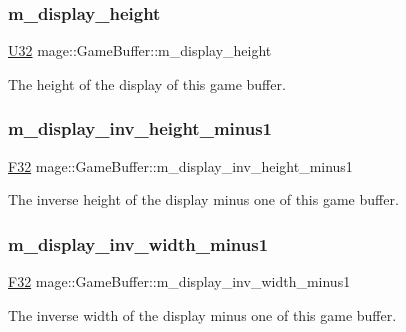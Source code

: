 \subsubsection{\texorpdfstring{m\+\_\+display\+\_\+height}{m\_display\_height}}
{\footnotesize\ttfamily \hyperlink{namespacemage_a41c104c036fba3756a74e19f793eeaa1}{U32} mage\+::\+Game\+Buffer\+::m\+\_\+display\+\_\+height}

The height of the display of this game buffer. \hypertarget{structmage_1_1_game_buffer_a1958156c6deefba5161e7aab7204a5ea}{}\label{structmage_1_1_game_buffer_a1958156c6deefba5161e7aab7204a5ea} 
\subsubsection{\texorpdfstring{m\+\_\+display\+\_\+inv\+\_\+height\+\_\+minus1}{m\_display\_inv\_height\_minus1}}
{\footnotesize\ttfamily \hyperlink{namespacemage_aa97e833b45f06d60a0a9c4fc22ae02c0}{F32} mage\+::\+Game\+Buffer\+::m\+\_\+display\+\_\+inv\+\_\+height\+\_\+minus1}

The inverse height of the display minus one of this game buffer. \hypertarget{structmage_1_1_game_buffer_a7db70b391fbf5ba58018d4f77ff06bba}{}\label{structmage_1_1_game_buffer_a7db70b391fbf5ba58018d4f77ff06bba} 
\subsubsection{\texorpdfstring{m\+\_\+display\+\_\+inv\+\_\+width\+\_\+minus1}{m\_display\_inv\_width\_minus1}}
{\footnotesize\ttfamily \hyperlink{namespacemage_aa97e833b45f06d60a0a9c4fc22ae02c0}{F32} mage\+::\+Game\+Buffer\+::m\+\_\+display\+\_\+inv\+\_\+width\+\_\+minus1}

The inverse width of the display minus one of this game buffer. \hypertarget{structmage_1_1_game_buffer_abc3b318a7c0d608bd1d72124032d7af8}{}\label{structmage_1_1_game_buffer_abc3b318a7c0d608bd1d72124032d7af8} 
